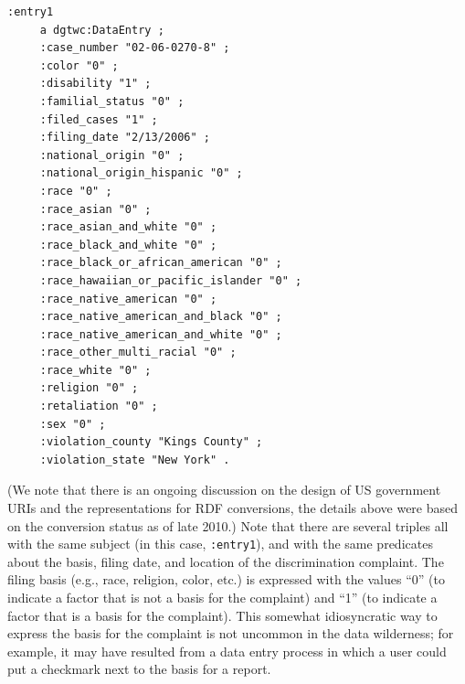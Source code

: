 \begin{lstlisting}
:entry1
     a dgtwc:DataEntry ;
     :case_number "02-06-0270-8" ;
     :color "0" ;
     :disability "1" ;
     :familial_status "0" ;
     :filed_cases "1" ;
     :filing_date "2/13/2006" ;
     :national_origin "0" ;
     :national_origin_hispanic "0" ;
     :race "0" ;
     :race_asian "0" ;
     :race_asian_and_white "0" ;
     :race_black_and_white "0" ;
     :race_black_or_african_american "0" ;
     :race_hawaiian_or_pacific_islander "0" ;
     :race_native_american "0" ;
     :race_native_american_and_black "0" ;
     :race_native_american_and_white "0" ;
     :race_other_multi_racial "0" ;
     :race_white "0" ;
     :religion "0" ;
     :retaliation "0" ;
     :sex "0" ;
     :violation_county "Kings County" ;
     :violation_state "New York" .
\end{lstlisting}

(We note that there is an ongoing discussion on the design of US
government URIs and the representations for RDF conversions, the details
above were based on the conversion status as of late 2010.) Note that
there are several triples all with the same subject (in this case,
\texttt{:entry1}), and with the same predicates about the basis, filing date, and
location of the discrimination complaint. The filing basis (e.g., race,
religion, color, etc.) is expressed with the values ``0'' (to indicate a
factor that is not a basis for the complaint) and ``1'' (to indicate a
factor that is a basis for the complaint). This somewhat idiosyncratic
way to express the basis for the complaint is not uncommon in the data
wilderness; for example, it may have resulted from a data entry process
in which a user could put a checkmark next to the basis for a report.

